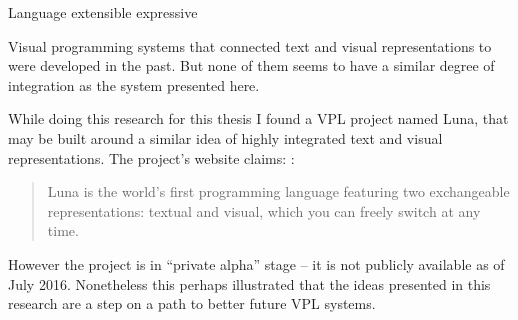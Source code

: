 Language
    extensible
    expressive


Visual programming systems that connected text and visual representations to were developed in the past\cite{snapshots}. But none of them seems to have a similar degree of integration as the system presented here.

While doing this research for this thesis I found a VPL project named Luna, that may be built around a similar idea of highly integrated text and visual representations. The project's website claims:
\cite{luna_website}:
\begin{quote}
Luna is the world’s first programming language featuring two exchangeable representations: textual and visual, which you can freely switch at any time.
\end{quote}

However the project is in ``private alpha'' stage -- it is not publicly available as of July 2016. Nonetheless this perhaps illustrated that the ideas presented in this research are a step on a path to better future VPL systems. 